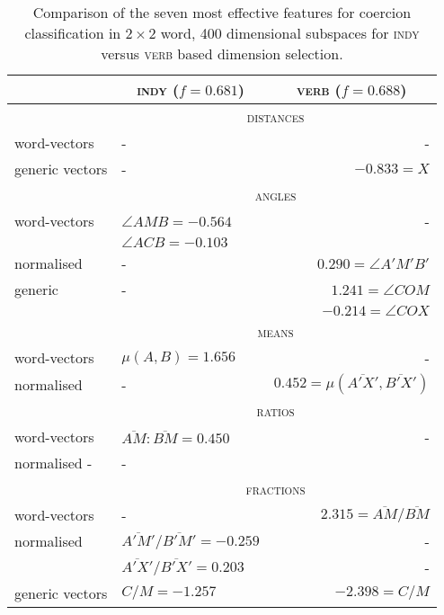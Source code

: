 \begin{table}
\centering
\begin{tabular}{llr}
\hline
& \multicolumn{1}{c}{\textsc{indy} ($f = 0.681$)} & \multicolumn{1}{c}{\textsc{verb} ($f = 0.688$)} \\
\hline
& \multicolumn{2}{c}{\textsc{distances}} \\
word-vectors & - & - \\
generic vectors & - & $-0.833 = X$ \\
\hline
& \multicolumn{2}{c}{\textsc{angles}} \\
word-vectors & $\angle AMB = -0.564$ & - \\
& $\angle ACB = -0.103$ \\
normalised & - & $0.290 = \angle A'M'B'$ \\
generic & - & $1.241 = \angle COM$ \\
& & $-0.214 = \angle COX$ \\
\hline
& \multicolumn{2}{c}{\textsc{means}} \\
word-vectors & $\mu(A,B) = 1.656$ & - \\
normalised & - & $0.452 = \mu(\overline{A'X'},\overline{B'X'})$ \\
\hline
& \multicolumn{2}{c}{\textsc{ratios}} \\
word-vectors & $\overline{AM}:\overline{BM} = 0.450$ & - \\
normalised - & - \\
\hline
& \multicolumn{2}{c}{\textsc{fractions}} \\
word-vectors & - & $2.315 = \overline{AM}/\overline{BM}$ \\
normalised & $\overline{A'M'}/\overline{B'M'} = -0.259$ & - \\
& $\overline{A'X'}/\overline{B'X'} = 0.203$ & - \\
generic vectors & $C/M = -1.257$ & $-2.398 = C/M$ \\
\hline
\end{tabular}
\caption[Most Predictive Feature Vectors for Coercion Classification]{Comparison of the seven most effective features for coercion classification in $2 \times 2$ word, 400 dimensional subspaces for \textsc{indy} versus \textsc{verb} based dimension selection.}
\label{tab:coertures}
\end{table}

